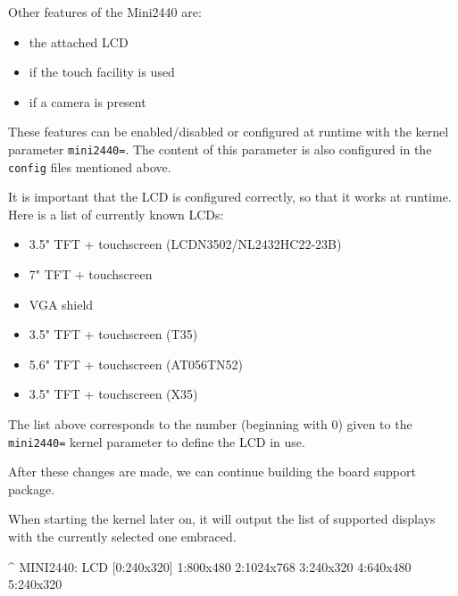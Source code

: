 Other features of the Mini2440 are:

\begin{itemize}
 \item the attached LCD
 \item if the touch facility is used
 \item if a camera is present
\end{itemize}

These features can be enabled/disabled or configured at runtime with the kernel
parameter \texttt{mini2440=}. The content of this parameter is also configured
in the \texttt{config} files mentioned above.

It is important that the LCD is configured correctly, so that it works at
runtime. Here is a list of currently known LCDs:

\begin{itemize}
 \item 3.5" TFT + touchscreen (LCDN3502/NL2432HC22-23B)
 \item 7" TFT + touchscreen
 \item VGA shield
 \item 3.5" TFT + touchscreen (T35)
 \item 5.6" TFT + touchscreen (AT056TN52)
 \item 3.5" TFT + touchscreen (X35)
\end{itemize}

The list above corresponds to the number (beginning with 0) given to the
\texttt{mini2440=} kernel parameter to define the LCD in use.

After these changes are made, we can continue building the board support package.

When starting the kernel later on, it will output the list of supported displays
with the currently selected one embraced.

\begin{ptxshell}[escapechar=|]{^}
MINI2440: LCD [0:240x320] 1:800x480 2:1024x768 3:240x320 4:640x480 5:240x320
\end{ptxshell}
